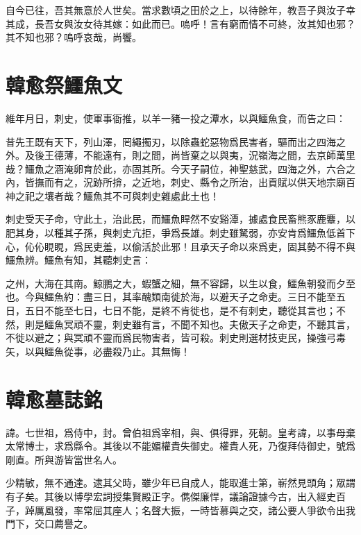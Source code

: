 自今已往，吾其無意於人世矣。當求數頃之田於之上，以待餘年，教吾子與汝子幸其成，長吾女與汝女待其嫁：如此而已。嗚呼！言有窮而情不可終，汝其知也邪？其不知也邪？嗚呼哀哉，尚饗。

\section[祭鱷魚文\quad{\small 韓愈}]{{\normalsize 韓愈}\quad 祭鱷魚文}
{\parindent=0pt 維年月日，刺史，使軍事衙推，以羊一豬一投之潭水，以與鱷魚食，而告之曰：}

昔先王既有天下，列山澤，罔繩擉刃，以除蟲蛇惡物爲民害者，驅而出之四海之外。及後王德薄，不能遠有，則之間，尚皆棄之以與夷，況嶺海之間，去京師萬里哉？鱷魚之涵淹卵育於此，亦固其所。今天子嗣位，神聖慈武，四海之外，六合之內，皆撫而有之，況跡所揜，之近地，刺史、縣令之所治，出貢賦以供天地宗廟百神之祀之壤者哉？鱷魚其不可與刺史雜處此土也！

刺史受天子命，守此土，治此民，而鱷魚睅然不安谿潭，據處食民畜熊豕鹿麞，以肥其身，以種其子孫，與刺史亢拒，爭爲長雄。刺史雖駑弱，亦安肯爲鱷魚低首下心，伈伈睍睍，爲民吏羞，以偷活於此邪！且承天子命以來爲吏，固其勢不得不與鱷魚辨。鱷魚有知，其聽刺史言：

之州，大海在其南。鯨鵬之大，蝦蟹之細，無不容歸，以生以食，鱷魚朝發而夕至也。今與鱷魚約：盡三日，其率醜類南徙於海，以避天子之命吏。三日不能至五日，五日不能至七日，七日不能，是終不肯徙也，是不有刺史，聽從其言也；不然，則是鱷魚冥頑不靈，刺史雖有言，不聞不知也。夫傲天子之命吏，不聽其言，不徙以避之；與冥頑不靈而爲民物害者，皆可殺。刺史則選材技吏民，操強弓毒矢，以與鱷魚從事，必盡殺乃止。其無悔！

\section[柳子厚墓誌銘\quad{\small 韓愈}]{{\normalsize 韓愈}\quad {}墓誌銘}
諱。七世祖，爲侍中，封。曾伯祖爲宰相，與、俱得罪，死朝。皇考諱，以事母棄太常博士，求爲縣令。其後以不能媚權貴失御史。權貴人死，乃復拜侍御史，號爲剛直。所與游皆當世名人。

少精敏，無不通達。逮其父時，雖少年已自成人，能取進士第，嶄然見頭角；眾謂有子矣。其後以博學宏詞授集賢殿正字。儁傑廉悍，議論證據今古，出入經史百子，踔厲風發，率常屈其座人；名聲大振，一時皆慕與之交，諸公要人爭欲令出我門下，交口薦譽之。

